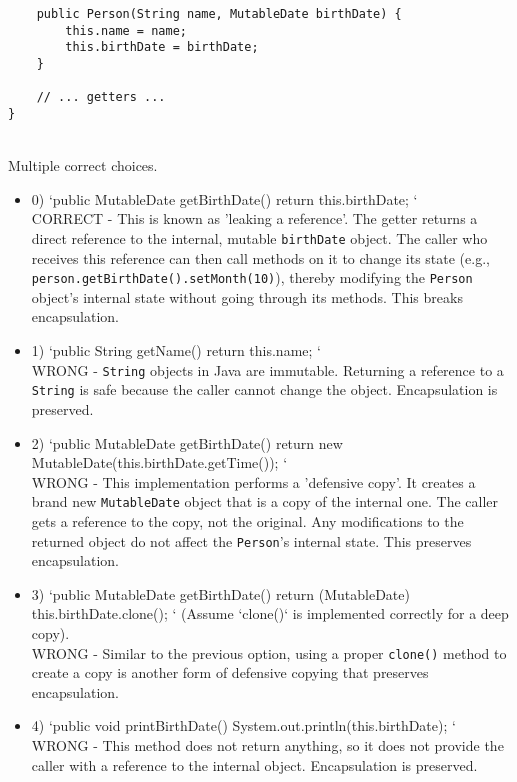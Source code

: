 \documentclass[12pt]{article}
\begin{document}
\begin{enumerate}[label=(\arabic*)]
\begin{verbatim}
    public Person(String name, MutableDate birthDate) {
        this.name = name;
        this.birthDate = birthDate;
    }

    // ... getters ...
}
\end{verbatim}
\\ \noindent Multiple correct choices. 
\begin{itemize}
\item 0) `public MutableDate getBirthDate() { return this.birthDate; }`
 \\ 
CORRECT - This is known as 'leaking a reference'. The getter returns a direct reference to the internal, mutable \verb|birthDate| object. The caller who receives this reference can then call methods on it to change its state (e.g., \verb|person.getBirthDate().setMonth(10)|), thereby modifying the \verb|Person| object's internal state without going through its methods. This breaks encapsulation.

\item 1) `public String getName() { return this.name; }`
 \\ 
WRONG - \verb|String| objects in Java are immutable. Returning a reference to a \verb|String| is safe because the caller cannot change the object. Encapsulation is preserved.

\item 2) `public MutableDate getBirthDate() { return new MutableDate(this.birthDate.getTime()); }`
 \\ 
WRONG - This implementation performs a 'defensive copy'. It creates a brand new \verb|MutableDate| object that is a copy of the internal one. The caller gets a reference to the copy, not the original. Any modifications to the returned object do not affect the \verb|Person|'s internal state. This preserves encapsulation.

\item 3) `public MutableDate getBirthDate() { return (MutableDate) this.birthDate.clone(); }` (Assume `clone()` is implemented correctly for a deep copy).
 \\ 
WRONG - Similar to the previous option, using a proper \verb|clone()| method to create a copy is another form of defensive copying that preserves encapsulation.

\item 4) `public void printBirthDate() { System.out.println(this.birthDate); }`
 \\ 
WRONG - This method does not return anything, so it does not provide the caller with a reference to the internal object. Encapsulation is preserved.


\end{itemize}
\end{enumerate}
\end{document}

